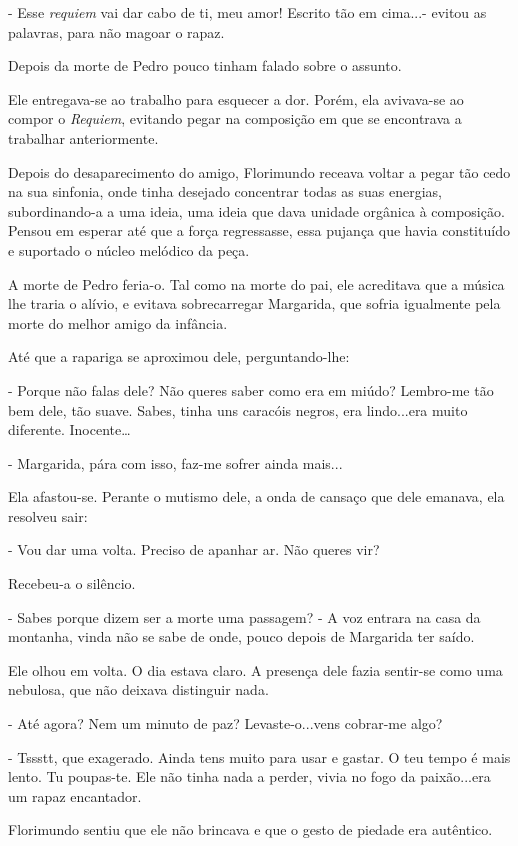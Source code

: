 - Esse \emph{requiem }vai dar cabo de ti, meu amor! Escrito tão em
cima...- evitou as palavras, para não magoar o rapaz.

Depois da morte de Pedro pouco tinham falado sobre o assunto.

Ele entregava-se ao trabalho para esquecer a dor. Porém, ela avivava-se
ao compor o \emph{Requiem}, evitando pegar na composição em que se
encontrava a trabalhar anteriormente.

Depois do desaparecimento do amigo, Florimundo receava voltar a pegar
tão cedo na sua sinfonia, onde tinha desejado concentrar todas as suas
energias, subordinando-a a uma ideia, uma ideia que dava unidade
orgânica à composição. Pensou em esperar até que a força regressasse,
essa pujança que havia constituído e suportado o núcleo melódico da
peça.

A morte de Pedro feria-o. Tal como na morte do pai, ele acreditava que a
música lhe traria o alívio, e evitava sobrecarregar Margarida, que
sofria igualmente pela morte do melhor amigo da infância.

Até que a rapariga se aproximou dele, perguntando-lhe:

- Porque não falas dele? Não queres saber como era em miúdo? Lembro-me
tão bem dele, tão suave. Sabes, tinha uns caracóis negros, era
lindo...era muito diferente. Inocente\ldots{}

- Margarida, pára com isso, faz-me sofrer ainda mais...

Ela afastou-se. Perante o mutismo dele, a onda de cansaço que dele
emanava, ela resolveu sair:

- Vou dar uma volta. Preciso de apanhar ar. Não queres vir?

Recebeu-a o silêncio.

- Sabes porque dizem ser a morte uma passagem? - A voz entrara na casa
da montanha, vinda não se sabe de onde, pouco depois de Margarida ter
saído.

Ele olhou em volta. O dia estava claro. A presença dele fazia sentir-se
como uma nebulosa, que não deixava distinguir nada.

- Até agora? Nem um minuto de paz? Levaste-o...vens cobrar-me algo?

- Tssstt, que exagerado. Ainda tens muito para usar e gastar. O teu
tempo é mais lento. Tu poupas-te. Ele não tinha nada a perder, vivia no
fogo da paixão...era um rapaz encantador.

Florimundo sentiu que ele não brincava e que o gesto de piedade era
autêntico.

